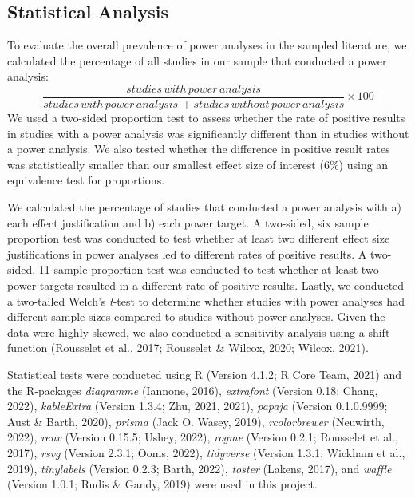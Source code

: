 \documentclass[
  man, donotrepeattitle,mask,floatsintext]{apa7}
\begin{document}
\pagebreak

\hypertarget{statistical-analysis}{%
\subsection{Statistical Analysis}\label{statistical-analysis}}

To evaluate the overall prevalence of power analyses in the sampled literature, we calculated the percentage of all studies in our sample that conducted a power analysis:
\[\frac{studies\, with\, power\, analysis}{studies\, with\, power\, analysis\, + studies\, without\, power\, analysis} \times 100\]
We used a two-sided proportion test to assess whether the rate of positive results in studies with a power analysis was significantly different than in studies without a power analysis. We also tested whether the difference in positive result rates was statistically smaller than our smallest effect size of interest (6\%) using an equivalence test for proportions.

We calculated the percentage of studies that conducted a power analysis with a) each effect justification and b) each power target. A two-sided, six sample proportion test was conducted to test whether at least two different effect size justifications in power analyses led to different rates of positive results. A two-sided, 11-sample proportion test was conducted to test whether at least two power targets resulted in a different rate of positive results. Lastly, we conducted a two-tailed Welch's \emph{t}-test to determine whether studies with power analyses had different sample sizes compared to studies without power analyses. Given the data were highly skewed, we also conducted a sensitivity analysis using a shift function (Rousselet et al., 2017; Rousselet \& Wilcox, 2020; Wilcox, 2021).

Statistical tests were conducted using R (Version 4.1.2; R Core Team, 2021) and the R-packages \emph{diagramme} (Iannone, 2016), \emph{extrafont} (Version 0.18; Chang, 2022), \emph{kableExtra} (Version 1.3.4; Zhu, 2021, 2021), \emph{papaja} (Version 0.1.0.9999; Aust \& Barth, 2020), \emph{prisma} (Jack O. Wasey, 2019), \emph{rcolorbrewer} (Neuwirth, 2022), \emph{renv} (Version 0.15.5; Ushey, 2022), \emph{rogme} (Version 0.2.1; Rousselet et al., 2017), \emph{rsvg} (Version 2.3.1; Ooms, 2022), \emph{tidyverse} (Version 1.3.1; Wickham et al., 2019), \emph{tinylabels} (Version 0.2.3; Barth, 2022), \emph{toster} (Lakens, 2017), and \emph{waffle} (Version 1.0.1; Rudis \& Gandy, 2019) were used in this project.
\end{document}

